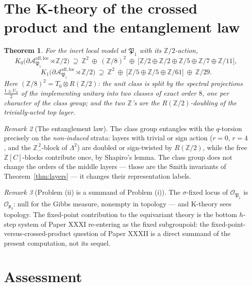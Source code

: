 \documentclass[11pt]{amsart}
\newtheorem{theorem}{Theorem}[section]
\theoremstyle{remark}
\newtheorem{remark}[theorem]{Remark}
\newcommand{\Z}{\mathbb{Z}}
\newcommand{\pp}{\mathfrak{p}}
\newcommand{\PP}{\mathfrak{P}}
\newcommand{\Aloc}{\mathcal{A}^{\mathrm{aff},\mathrm{loc}}}
\begin{document}
\section{The K-theory of the crossed product and the entanglement law}\label{sec:ktheory}

\begin{theorem}\label{thm:main}
For the inert local model at $\PP_1$ with its $\Z/2$-action,
\[
K_0\bigl(\partial\Aloc_{\PP_1}\rtimes\Z/2\bigr)\ \supseteq\
\Z^2\ \oplus\ (\Z/8)^2\ \oplus\
\bigl[\Z/2\oplus\Z/2\oplus\Z/5\oplus\Z/7\oplus\Z/11\bigr],
\]
\[
K_1\bigl(\partial\Aloc_{\PP_1}\rtimes\Z/2\bigr)\ \supseteq\
\Z^2\ \oplus\ \bigl[\Z/5\oplus\Z/5\oplus\Z/61\bigr]\ \oplus\ \Z/29 .
\]
Here $(\Z/8)^2=T_0\otimes R(\Z/2)$: \emph{the unit class is split by the spectral
projections $\tfrac{1\pm U_\sigma}2$ of the implementing unitary into two classes of
exact order $8$}, one per character of the class group; and the two $\Z$'s are the
$R(\Z/2)$-doubling of the trivially-acted top layer.
\end{theorem}

\begin{remark}[The entanglement law]\label{rem:law}
The class group entangles with the $q$-torsion precisely on the \emph{non-induced}
strata: layers with trivial or sign action ($r=0$, $r=4$, and the $\Z_-^{\,2}$-block of
$\Lambda^2$) are doubled or sign-twisted by $R(\Z/2)$, while the free $\Z[C]$-blocks
contribute once, by Shapiro's lemma. The class group does not change the orders of the
middle layers --- those are the Smith invariants of Theorem~\ref{thm:layers} --- it
changes their representation labels.
\end{remark}

\begin{remark}[Problem (ii) is a summand of Problem (i)]\label{rem:fixed}
The $\sigma$-fixed locus of $\mathcal O_{\PP_1}$ is $\mathcal O_{\pp_3}$: null for the
Gibbs measure, nonempty in topology --- and K-theory sees topology. The fixed-point
contribution to the equivariant theory is the bottom $h$-step system of Paper XXXI
re-entering as the fixed subgroupoid: the fixed-point-versus-crossed-product question of
Paper XXXII is a direct summand of the present computation, not its sequel.
\end{remark}

\section{Assessment}\label{sec:assessment}
\end{document}
